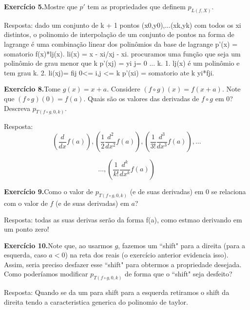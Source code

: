 \documentclass{article}
\begin{document}
\begin{flushleft}
{\begin{exercicio}
  \textbf{Exercício 5.}Mostre que $p'$ tem as propriedades que definem $p_{L(f, X)}$.\\
\end{exercicio}
Resposta:  dado um conjunto de k + 1 pontos
    (x0,y0),...(xk,yk) com todos os xi distintos, o polinomio de interpolação de um conjunto de pontos na forma de lagrange é uma combinação linear dos polinômios da base de lagrange
 p'(x) = somatorio f(x)*lj(x).
 li(x) = x - xi/xj - xi.
procuramos uma função que seja um polinômio de grau menor que k
 p'(xj) = yi j= 0 ... k.
1. lj(x) é um polinômio e tem grau k.
2. li(xj)= fij 0<= i,j <= k
p'(xi) = somatorio ate k yi*fji. \newline



\begin{exercicio}
  \textbf{Exercício 8.}Tome $g(x) = x + a$. Considere $(f \circ g)(x) = f(x + a)$. Note que
  $(f \circ g)(0) = f(a)$. Quais são os valores das derivadas de
  $f \circ g$ em 0? Descreva $p_{T(f \circ g, 0, k)}$.
\end{exercicio}
Resposta: $$\left(\frac{d}{dx} f(a)\right) , \left(\frac{1}{2} \frac{d^2}{dx^2} f(a)\right), \left(\frac{1}{3!} \frac{d^3}{dx^3} f(a)\right), \dots
$$

$$
\dots ,\left(\frac{1}{k!} \frac{d^k}{dx^k} f(a)\right)
$$\newline

\begin{exercicio}
  \textbf{Exercício 9.}Como o valor de $p_{T(f \circ g, 0, k)}$ (e de suas derivadas) em 0
  se relaciona com o valor de $f$ (e de suas derivadas) em $a$?\\
\end{exercicio}
Resposta: todas as suas derivas serão da forma f(a), como estmao derivando em um ponto zero!\newline

\begin{exercicio}
  \textbf{Exercício 10.}Note que, ao usarmos $g$, fazemos um ``shift" para a direita (para a
  esquerda, caso $a < 0$) na reta dos reais (o exercício anterior
  evidencia isso). Assim, seria preciso desfazer esse ``shift" para
  obtermos a propriedade desejada. Como poderíamos modificar
  $p_{T(f \circ g, 0, k)}$ de forma que o ``shift" seja desfeito?
\end{exercicio}

Resposta: Quando se da um para shift para a esquerda retiramos o shift da direita  tendo a caracteristica generica do polinomio de taylor.\newline

}
\end{flushleft}
\end{document}
